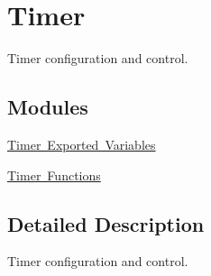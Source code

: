 \hypertarget{group___s_d___t_i_m}{}\section{Timer}
\label{group___s_d___t_i_m}


Timer configuration and control.  


\subsection*{Modules}
\begin{DoxyCompactItemize}
\item 
\mbox{\hyperlink{group___s_d___t_i_m___exported___variables}{Timer Exported Variables}}
\item 
\mbox{\hyperlink{group___s_d___t_i_m___functions}{Timer Functions}}
\end{DoxyCompactItemize}


\subsection{Detailed Description}
Timer configuration and control. 


